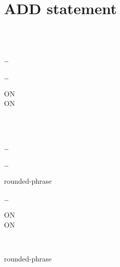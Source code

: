 \section{ADD statement}

\begin{1=}
  \identifier \\
  \literal \\
\end{1=} \ldots
{}
\begin{1=}
  \identifier
\end{1=} \ldots

\begin{0+}
  ON   \imperativestatement \\
   ON   \imperativestatement
\end{0+}


\begin{0-1}
\end{0-1}

\begin{1=}
  \identifier \\
  \literal \\
\end{1=} \ldots
\begin{0-1}
  \begin{0-1}
    \identifier
  \end{0-1} \ldots
\end{0-1}

\begin{1=}
  \identifier
  \begin{0-1}
    rounded-phrase
  \end{0-1}
\end{1=} \ldots

\begin{0+}
  ON   \imperativestatement \\
   ON   \imperativestatement
\end{0+}

\begin{0-1}
\end{0-1}

\begin{1=}
   \\
\end{1=}
\identifier {} \identifier
\begin{0-1}
  rounded-phrase
\end{0-1}

